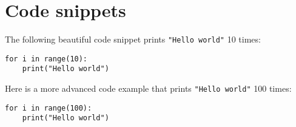 \documentclass[10pt,a4paper]{article}
\begin{document}
\newpage


\section*{Code snippets}
The following beautiful code snippet prints \lstinline{"Hello world"} 10 times:
\begin{lstlisting}
for i in range(10):
    print("Hello world")
\end{lstlisting}
Here is a more advanced code example that prints \lstinline{"Hello world"} 100 times:
\begin{lstlisting}
for i in range(100):
    print("Hello world")
\end{lstlisting}

\newpage



\end{document}
